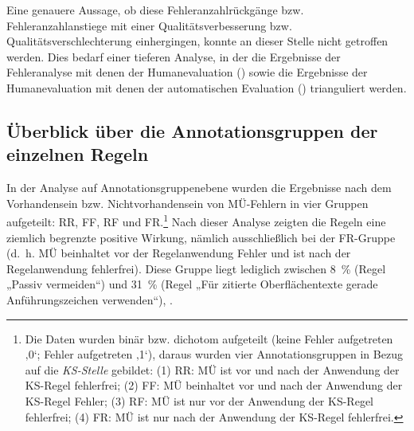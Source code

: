 Eine genauere Aussage, ob diese Fehleranzahlrückgänge bzw. Fehleranzahlanstiege mit einer Qualitätsverbesserung bzw. Qualitätsverschlechterung einhergingen, konnte an dieser Stelle nicht getroffen werden. Dies bedarf einer tieferen Analyse, in der die Ergebnisse der Fehleranalyse mit denen der Humanevaluation () sowie die Ergebnisse der Humanevaluation mit denen der automatischen Evaluation () trianguliert werden.

\subsection{Überblick über die Annotationsgruppen der einzelnen Regeln}

In der Analyse auf Annotationsgruppenebene wurden die Ergebnisse nach dem Vorhandensein bzw. Nichtvorhandensein von MÜ-Fehlern in vier Gruppen aufgeteilt: RR, FF, RF und FR.\footnote{\textrm{Die Daten wurden binär bzw. dichotom aufgeteilt (keine Fehler aufgetreten ‚0‘; Fehler aufgetreten ‚1‘), daraus wurden vier Annotationsgruppen in Bezug auf die} \textrm{\textit{KS-Stelle}} \textrm{gebildet: (1) RR: MÜ ist vor und nach der Anwendung der KS-Regel fehlerfrei; (2) FF: MÜ beinhaltet vor und nach der Anwendung der KS-Regel Fehler; (3) RF: MÜ ist nur vor der Anwendung der KS-Regel fehlerfrei; (4) FR: MÜ ist nur nach der Anwendung der KS-Regel fehlerfrei.}} Nach dieser Analyse zeigten die Regeln eine ziemlich begrenzte positive Wirkung, nämlich ausschließlich bei der FR-Gruppe (d.~h. MÜ beinhaltet vor der Regelanwendung Fehler und ist nach der Regelanwendung fehlerfrei). Diese Gruppe liegt lediglich zwischen 8~\% (Regel „Passiv vermeiden“) und 31~\% (Regel „Für zitierte Oberflächentexte gerade Anführungszeichen verwenden“), .


